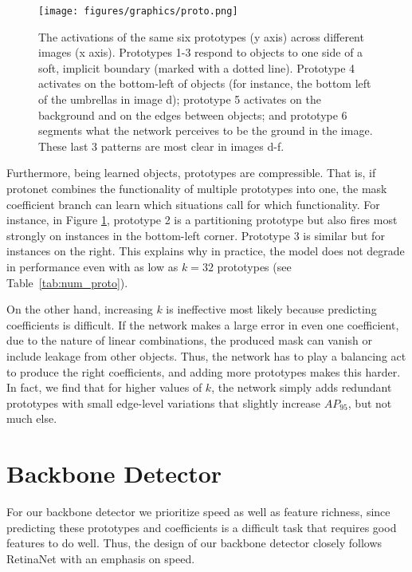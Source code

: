 \documentclass[10pt,journal,compsoc]{IEEEtran}
\begin{document}
    \begin{figure}[t!]
    \centering
    \texttt{[image: figures/graphics/proto.png]}
\caption{ The activations of the same six prototypes (y axis) across different images (x axis). Prototypes 1-3 respond to objects to one side of a soft, implicit boundary (marked with a dotted line). Prototype 4 activates on the bottom-left of objects (for instance, the bottom left of the umbrellas in image d); prototype 5 activates on the background and on the edges between objects; and prototype 6 segments what the network perceives to be the ground in the image. These last 3 patterns are most clear in images d-f.}
\label{fig:behavior}
    
\end{figure} 
Furthermore, being learned objects, prototypes are compressible. That is, if protonet combines the functionality of multiple prototypes into one, the mask coefficient branch can learn which situations call for which functionality. For instance, in Figure \ref{fig:behavior}, prototype 2 is a partitioning prototype but also fires most strongly on instances in the bottom-left corner. Prototype 3 is similar but for instances on the right. This explains why in practice, the model does not degrade in performance even with as low as $k=32$ prototypes (see Table~\ref{tab:num_proto}).

On the other hand, increasing $k$ is ineffective most likely because predicting coefficients is difficult. If the network makes a large error in even one coefficient, due to the nature of linear combinations, the produced mask can vanish or include leakage from other objects. Thus, the network has to play a balancing act to produce the right coefficients, and adding more prototypes makes this harder. In fact, we find that for higher values of $k$, the network simply adds redundant prototypes with small edge-level variations that slightly increase $AP_{95}$, but not much else.
\section{Backbone Detector}

For our backbone detector we prioritize speed as well as feature richness, since predicting these prototypes and coefficients is a difficult task that requires good features to do well. Thus, the design of our backbone detector closely follows RetinaNet \cite{retinanet} with an emphasis on speed.
\end{document}
